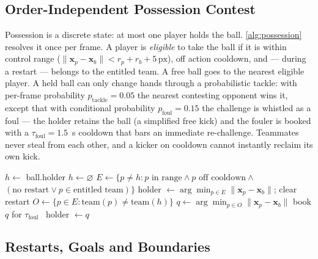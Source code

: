 \documentclass[10pt,twocolumn]{article}
\newcommand{\px}{\ensuremath{\,\mathrm{px}}}
\begin{document}
\subsection{Order-Independent Possession Contest}\label{sec:contest}

Possession is a discrete state: at most one player holds the ball.
\cref{alg:possession} resolves it once per frame. A player is
\emph{eligible} to take the ball if it is within control range
($\lVert\mathbf x_p - \mathbf x_b\rVert < r_p + r_b + 5\px$), off action
cooldown, and --- during a restart --- belongs to the entitled team. A free
ball goes to the nearest eligible player. A held ball can only change hands
through a probabilistic tackle: with per-frame probability
$p_{\text{tackle}} = 0.05$ the nearest contesting opponent wins it, except
that with conditional probability $p_{\text{foul}} = 0.15$ the challenge is
whistled as a foul --- the holder retains the ball (a simplified free kick)
and the fouler is booked with a $\tau_{\text{foul}}=1.5$~s cooldown that
bars an immediate re-challenge. Teammates never steal from each other, and
a kicker on cooldown cannot instantly reclaim its own kick.

\begin{algorithm}[t]
\caption{\textsc{ResolvePossession} --- fair per-frame contest.}
\label{alg:possession}
\begin{algorithmic}[1]
 \Return {}
\EndIf
\State $h \gets$ ball.holder
 $h \gets \varnothing$
\EndIf
\State $E \gets \{p \neq h : p \text{ in range} \wedge p \text{ off cooldown} \wedge{}$
\Statex \hspace{\algorithmicindent}$(\text{no restart} \vee p \in \text{entitled team})\}$
   holder $\gets \arg\min_{p \in E} \lVert\mathbf x_p - \mathbf x_b\rVert$; clear restart
  \EndIf
  \State \Return
\EndIf
\State $O \gets \{p \in E : \text{team}(p) \neq \text{team}(h)\}$
  \State $q \gets \arg\min_{p \in O} \lVert\mathbf x_p - \mathbf x_b\rVert$
   book $q$ for $\tau_{\text{foul}}$ 
  \Else\ holder $\gets q$
  \EndIf
\EndIf
\end{algorithmic}
\end{algorithm}

\subsection{Restarts, Goals and Boundaries}\label{sec:restarts}
\end{document}
